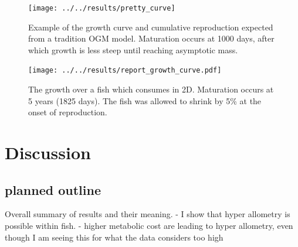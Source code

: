 \documentclass[a4paper, 11pt, hidelinks]{article} %
\begin{document}
	\begin{figure}
		\centering
		\texttt{[image: ../../results/pretty\_curve]}
		\caption{Example of the growth curve and cumulative reproduction expected from a tradition OGM model. Maturation occurs at 1000 days, after which growth is less steep until reaching asymptotic mass.}
		\label{OGM_Curve}
	\end{figure}
	
	\begin{figure}
		
		\texttt{[image: ../../results/report\_growth\_curve.pdf]}
		\caption{The growth over a fish which consumes in 2D.  Maturation occurs at 5 years (1825 days).  The fish was allowed to shrink by 5\% at the onset of reproduction.}
		\label{growth_curve}
	\end{figure}



	\nolinenumbers
	
\section{Discussion}
	\linenumbers
	
	
	
	


	
	
	
	\subsection{planned outline}
	Overall summary of results and their meaning.
	- I show that hyper allometry is possible within fish.  
	- higher metabolic cost are leading to hyper allometry, even though I am seeing this for what the data considers too high \parencite{Marshall2019} %
	
\end{document}
